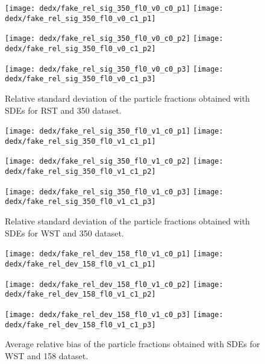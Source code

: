 \begin{figure}
  \centering
  \texttt{[image: dedx/fake\_rel\_sig\_350\_fl0\_v0\_c0\_p1]}
  \texttt{[image: dedx/fake\_rel\_sig\_350\_fl0\_v0\_c1\_p1]}

  \texttt{[image: dedx/fake\_rel\_sig\_350\_fl0\_v0\_c0\_p2]}
  \texttt{[image: dedx/fake\_rel\_sig\_350\_fl0\_v0\_c1\_p2]}

  \texttt{[image: dedx/fake\_rel\_sig\_350\_fl0\_v0\_c0\_p3]}
  \texttt{[image: dedx/fake\_rel\_sig\_350\_fl0\_v0\_c1\_p3]}


  \caption{Relative standard deviation of the particle fractions obtained with SDEs for RST and 350 \GeVc dataset.}
  \label{fig:hadron:dedx:fit:fake:relsig350r}
\end{figure}

\begin{figure}
  \centering
  \texttt{[image: dedx/fake\_rel\_sig\_350\_fl0\_v1\_c0\_p1]}
  \texttt{[image: dedx/fake\_rel\_sig\_350\_fl0\_v1\_c1\_p1]}

  \texttt{[image: dedx/fake\_rel\_sig\_350\_fl0\_v1\_c0\_p2]}
  \texttt{[image: dedx/fake\_rel\_sig\_350\_fl0\_v1\_c1\_p2]}

  \texttt{[image: dedx/fake\_rel\_sig\_350\_fl0\_v1\_c0\_p3]}
  \texttt{[image: dedx/fake\_rel\_sig\_350\_fl0\_v1\_c1\_p3]}

  \caption{Relative standard deviation of the particle fractions obtained with SDEs for WST and 350 \GeVc dataset.}
  \label{fig:hadron:dedx:fit:fake:relsig350w}
\end{figure}


\begin{figure}
  \centering
  \texttt{[image: dedx/fake\_rel\_dev\_158\_fl0\_v1\_c0\_p1]}
  \texttt{[image: dedx/fake\_rel\_dev\_158\_fl0\_v1\_c1\_p1]}

  \texttt{[image: dedx/fake\_rel\_dev\_158\_fl0\_v1\_c0\_p2]}
  \texttt{[image: dedx/fake\_rel\_dev\_158\_fl0\_v1\_c1\_p2]}

  \texttt{[image: dedx/fake\_rel\_dev\_158\_fl0\_v1\_c0\_p3]}
  \texttt{[image: dedx/fake\_rel\_dev\_158\_fl0\_v1\_c1\_p3]}

  \caption{Average relative bias of the particle fractions obtained with SDEs for WST and 158 \GeVc dataset.}
  \label{fig:hadron:dedx:fit:fake:reldev158w}
\end{figure}



